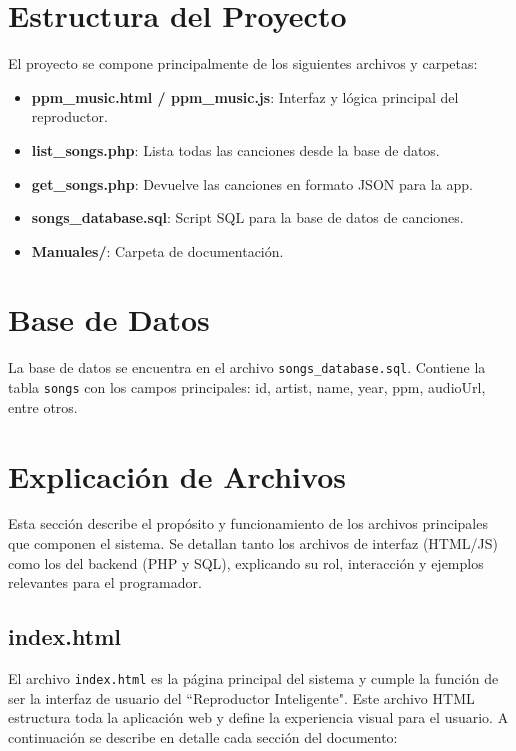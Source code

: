 \documentclass[a4paper,12pt]{article}
\begin{document}
\section{Estructura del Proyecto}
El proyecto se compone principalmente de los siguientes archivos y carpetas:
\begin{itemize}
    \item \textbf{ppm\_music.html / ppm\_music.js}: Interfaz y lógica principal del reproductor.
    \item \textbf{list\_songs.php}: Lista todas las canciones desde la base de datos.
    \item \textbf{get\_songs.php}: Devuelve las canciones en formato JSON para la app.
    \item \textbf{songs\_database.sql}: Script SQL para la base de datos de canciones.
    \item \textbf{Manuales/}: Carpeta de documentación.
\end{itemize}

\section{Base de Datos}
La base de datos se encuentra en el archivo \texttt{songs\_database.sql}. Contiene la tabla \texttt{songs} con los campos principales: id, artist, name, year, ppm, audioUrl, entre otros.

\section{Explicación de Archivos}
Esta sección describe el propósito y funcionamiento de los archivos principales que componen el sistema. Se detallan tanto los archivos de interfaz (HTML/JS) como los del backend (PHP y SQL), explicando su rol, interacción y ejemplos relevantes para el programador.

\subsection{index.html}
El archivo \texttt{index.html} es la página principal del sistema y cumple la función de ser la interfaz de usuario del ``Reproductor Inteligente". Este archivo HTML estructura toda la aplicación web y define la experiencia visual para el usuario. A continuación se describe en detalle cada sección del documento:
\end{document}
